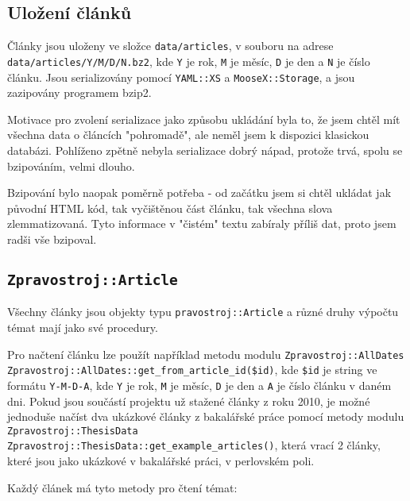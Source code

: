 \documentclass[12pt,a4paper]{report}
\begin{document}
\subsection{Uložení článků}
		
Články jsou uloženy ve složce \texttt{data/articles}, v souboru na adrese \texttt{data/articles/Y/M/D/N.bz2}, kde \texttt{Y} je rok, \texttt{M} je měsíc, \texttt{D} je den a \texttt{N} je číslo článku. Jsou serializovány pomocí \texttt{YAML::XS} a \texttt{MooseX::Storage}, a jsou zazipovány programem bzip2.

Motivace pro zvolení serializace jako způsobu ukládání byla to, že jsem chtěl mít všechna data o článcích "pohromadě", ale neměl jsem k dispozici klasickou databázi. Pohlíženo zpětně nebyla serializace dobrý nápad, protože trvá, spolu se bzipováním, velmi dlouho.

Bzipování bylo naopak poměrně potřeba - od začátku jsem si chtěl ukládat jak původní HTML kód, tak vyčištěnou část článku, tak všechna slova zlemmatizovaná. Tyto informace v "čistém" textu zabíraly příliš dat, proto jsem radši vše bzipoval.

\subsection{\texttt{Zpravostroj::Article}}

Všechny články jsou objekty typu \texttt{pravostroj::Article} a různé druhy výpočtu témat mají jako své procedury.

Pro načtení článku lze použít například metodu modulu \texttt{Zpravostroj::AllDates} \texttt{Zpravostroj::AllDates::get\_from\_article\_id(\$id)}, kde \texttt{\$id} je string ve formátu \texttt{Y-M-D-A}, kde \texttt{Y} je rok, \texttt{M} je měsíc, \texttt{D} je den a \texttt{A} je číslo článku v daném dni. Pokud jsou součástí projektu už stažené články z roku 2010, je možné jednoduše načíst dva ukázkové články z bakalářské práce pomocí metody modulu \texttt{Zpravostroj::ThesisData} \texttt{Zpravostroj::ThesisData::get\_example\_articles()}, která vrací 2 články, které jsou jako ukázkové v bakalářské práci, v perlovském poli.

Každý článek má tyto metody pro čtení témat:
\end{document}
